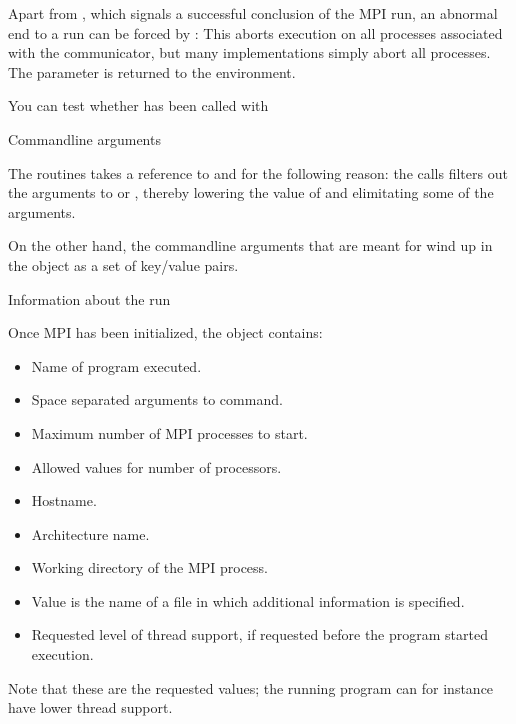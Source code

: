 Apart from , which signals a successful
conclusion of the MPI run, an abnormal end to a run can be forced by
:
%
%
This aborts execution on all processes associated with the communicator,
but many implementations simply abort all processes. The  parameter
is returned to the environment.

You can test whether  has been called with
%

 {Commandline arguments}

The  routines takes a reference to 
and  for the following reason: the  calls
filters out the arguments to  or ,
thereby lowering the value of  and elimitating some of the 
arguments.

On the other hand, the commandline arguments that are meant for 
wind up in the  object as a set of key/value pairs.

 {Information about the run}

Once MPI has been initialized, the  object contains:
\begin{itemize}
\item {}
  Name of program executed.
\item  {}
  Space separated arguments to command.
\item  {}
  Maximum number of MPI processes to start.
\item   {}
  Allowed values for number of processors.
\item   {}
  Hostname.
\item   {}
  Architecture name.
\item   {}
  Working directory of the MPI process.
\item   {}
  Value is the name of a file in which additional information is specified.
\item   {}
  Requested level of thread support, if requested before the program started execution.
\end{itemize}
Note that these are the requested values; the running program can for instance
have lower thread support.




